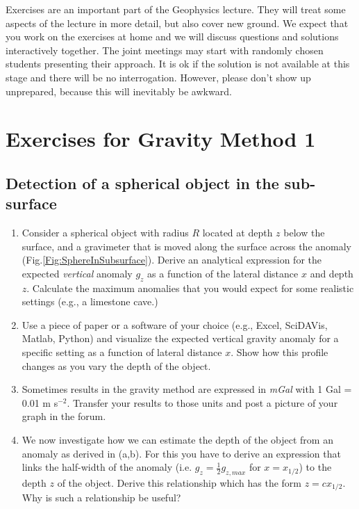 \documentclass[a4paper,12pt]{article}
\begin{document}
\begin{tcolorbox}[enhanced jigsaw,breakable,pad at break*=1mm,
    colback=blue!5!white,colframe=burgundy,title=Expectations for Exercises]
    Exercises are an important part of the Geophysics lecture. They will treat some aspects of the lecture in more detail, but also cover new ground. We expect that you work on the exercises at home and we will discuss questions and solutions interactively together. The joint meetings may start with randomly chosen students presenting their approach. It is ok if the solution is not available at this stage and there will be no interrogation. However, please don't show up unprepared, because this will inevitably be awkward. 
\end{tcolorbox}

\section{Exercises for Gravity Method 1}
\subsection{Detection of a spherical object in the sub-surface}
\label{Sec:SphereInSubsurface}
\begin{enumerate}[label=(\alph*)]
  \item Consider a spherical object with radius $R$ located at depth $z$ below the surface, and a gravimeter that is moved along the surface across the anomaly (Fig.\ref{Fig:SphereInSubsurface}). Derive an analytical expression for the expected \textit{vertical} anomaly $g_z$ as a function of the lateral distance $x$ and depth $z$. Calculate the maximum anomalies that you would expect for some realistic settings (e.g., a limestone cave.)

  \item Use a piece of paper or a software of your choice (e.g., Excel, SciDAVis, Matlab, Python) and visualize the expected vertical gravity anomaly for a specific setting as a function of lateral distance $x$. Show how this profile changes as you vary the depth of the object. 

  \item Sometimes results in the gravity method are expressed in \textit{mGal} with 1 Gal = 0.01 m s$^{-2}$. Transfer your results to those units and post a picture of your graph in the forum.

  \item We now investigate how we can estimate the depth of the object from an anomaly as derived in (a,b). For this you have to derive an expression that links the half-width of the anomaly (i.e. $g_z = \frac{1}{2}g_{z,max}$ for $x=x_{1/2}$) to the depth $z$ of the object. Derive this relationship which has the form $z = c x_{1/2}$. Why is such a relationship be useful?
\end{enumerate}
\end{document}
